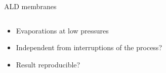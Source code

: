 \documentclass[../defence.tex]{subfiles}
\begin{document}
\begin{frame}{ALD membranes}
\begin{columns}[onlytextwidth, T]
        \begin{tiny}
          \begin{itemize}
            \item Evaporations at low pressures
            \pause

            \item Independent from interruptions of the process?
            \pause
            
            \item Result reproducible?
          \end{itemize}
        \end{tiny}
    \end{columns}
  \end{frame}
\end{document}
